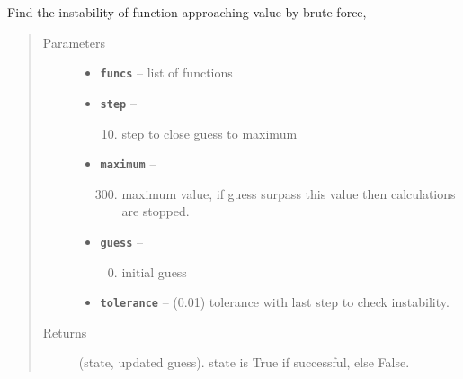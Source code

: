 \documentclass[letterpaper,10pt,english]{sphinxmanual}
\begin{document}

\begin{fulllineitems}
\label{RRtoolbox.lib.arrayops:RRtoolbox.lib.arrayops.basic.instability_bf}
Find the instability of function approaching value by brute force,
\begin{quote}\begin{description}
\item[{Parameters}] \leavevmode\begin{itemize}
\item {} 
\textbf{\texttt{funcs}} -- list of functions

\item {} 
\textbf{\texttt{step}} -- \begin{enumerate}
\setcounter{enumi}{9}
\item {} 
step to close guess to maximum

\end{enumerate}


\item {} 
\textbf{\texttt{maximum}} -- \begin{enumerate}
\setcounter{enumi}{299}
\item {} 
maximum value, if guess surpass this value then calculations are stopped.

\end{enumerate}


\item {} 
\textbf{\texttt{guess}} -- \begin{enumerate}
\setcounter{enumi}{-1}
\item {} 
initial guess

\end{enumerate}


\item {} 
\textbf{\texttt{tolerance}} -- (0.01) tolerance with last step to check instability.

\end{itemize}

\item[{Returns}] \leavevmode
(state, updated guess). state is True if successful, else False.

\end{description}\end{quote}

\end{fulllineitems}
\end{document}
